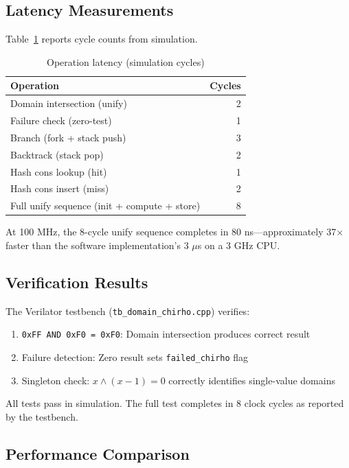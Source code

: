 \documentclass[11pt,a4paper]{article}
\begin{document}
\subsection{Latency Measurements}
\label{subsec:latency_chirho}

Table~\ref{tab:latency_chirho} reports cycle counts from simulation.

\begin{table}[ht]
\centering
\caption{Operation latency (simulation cycles)}
\label{tab:latency_chirho}
\begin{tabular}{lr}
\toprule
\textbf{Operation} & \textbf{Cycles} \\
\midrule
Domain intersection (unify) & 2 \\
Failure check (zero-test) & 1 \\
Branch (fork + stack push) & 3 \\
Backtrack (stack pop) & 2 \\
Hash cons lookup (hit) & 1 \\
Hash cons insert (miss) & 2 \\
Full unify sequence (init + compute + store) & 8 \\
\bottomrule
\end{tabular}
\end{table}

At 100 MHz, the 8-cycle unify sequence completes in 80 ns---approximately
37$\times$ faster than the software implementation's 3 $\mu$s on a 3 GHz CPU.

\subsection{Verification Results}
\label{subsec:verification_chirho}

The Verilator testbench (\texttt{tb\_domain\_chirho.cpp}) verifies:

\begin{enumerate}
  \item \texttt{0xFF AND 0xF0 = 0xF0}: Domain intersection produces correct result
  \item Failure detection: Zero result sets \texttt{failed\_chirho} flag
  \item Singleton check: $x \land (x-1) = 0$ correctly identifies single-value domains
\end{enumerate}

All tests pass in simulation. The full test completes in 8 clock cycles as
reported by the testbench.

\subsection{Performance Comparison}
\label{subsec:performance_chirho}
\end{document}
